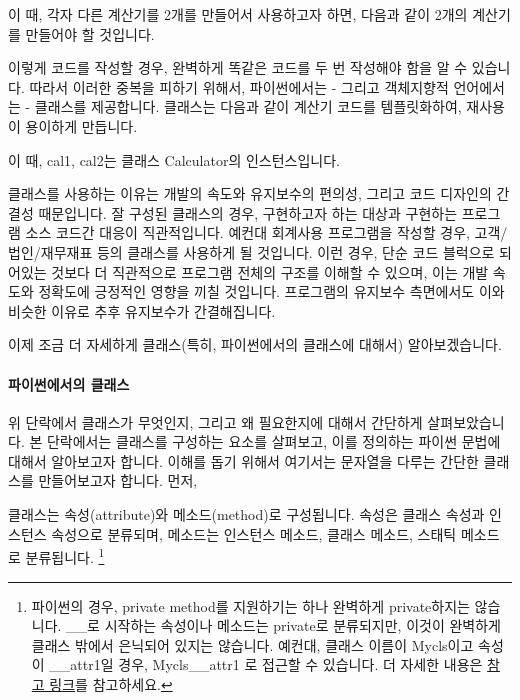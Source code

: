 

이 때, 각자 다른 계산기를 2개를 만들어서 사용하고자 하면, 다음과 같이 2개의 계산기를 만들어야 할 것입니다.



이렇게 코드를 작성할 경우, 완벽하게 똑같은 코드를 두 번 작성해야 함을 알 수 있습니다. 따라서 이러한 중복을 피하기 위해서, 파이썬에서는 - 그리고 객체지향적 언어에서는 - 클래스를 제공합니다. 클래스는 다음과 같이 계산기 코드를 템플릿화하여, 재사용이 용이하게 만듭니다. 




이 때, cal1, cal2는 클래스 Calculator의 인스턴스입니다. 

클래스를 사용하는 이유는 개발의 속도와 유지보수의 편의성, 그리고 코드 디자인의 간결성 때문입니다. 잘 구성된 클래스의 경우, 구현하고자 하는 대상과 구현하는 프로그램 소스 코드간 대응이 직관적입니다. 예컨대 회계사용 프로그램을 작성할 경우, 고객/법인/재무재표 등의 클래스를 사용하게 될 것입니다. 이런 경우, 단순 코드 블럭으로 되어있는 것보다 더 직관적으로 프로그램 전체의 구조를 이해할 수 있으며, 이는 개발 속도와 정확도에 긍정적인 영향을 끼칠 것입니다. 프로그램의 유지보수 측면에서도 이와 비슷한 이유로 추후 유지보수가 간결해집니다. 

이제 조금 더 자세하게 클래스(특히, 파이썬에서의 클래스에 대해서) 알아보겠습니다. 

\paragraph{파이썬에서의 클래스} 

위 단락에서 클래스가 무엇인지, 그리고 왜 필요한지에 대해서 간단하게 살펴보았습니다. 본 단락에서는 클래스를 구성하는 요소를 살펴보고, 이를 정의하는 파이썬 문법에 대해서 알아보고자 합니다. 이해를 돕기 위해서 여기서는 문자열을 다루는 간단한 클래스를 만들어보고자 합니다. 먼저, 

클래스는 속성(attribute)와 메소드(method)로 구성됩니다. 속성은 클래스 속성과 인스턴스 속성으로 분류되며, 메소드는 인스턴스 메소드, 클래스 메소드, 스태틱 메소드로 분류됩니다. \footnote{파이썬의 경우, private method를 지원하기는 하나 완벽하게 private하지는 않습니다. \_\_로 시작하는 속성이나 메소드는 private로 분류되지만, 이것이 완벽하게 클래스 밖에서 은닉되어 있지는 않습니다. 예컨대, 클래스 이름이 Mycls이고 속성이 \_\_attr1일 경우, Mycls\_\_attr1 로 접근할 수 있습니다. 더 자세한 내용은 \href{http://www.diveintopython.net/object\_oriented\_framework/private\_functions.html}{참고 링크}를 참고하세요. } 

